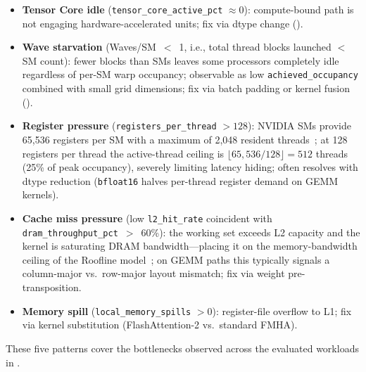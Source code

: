 \begin{itemize}[leftmargin=1.5em]
  \item \textbf{Tensor Core idle} (\texttt{tensor\_core\_active\_pct} $\approx 0$):
    compute-bound path is not engaging hardware-accelerated units; fix via dtype change
    ().
  \item \textbf{Wave starvation} (Waves/SM~$<$~1, i.e., total thread blocks launched
    $<$ SM count): fewer blocks than SMs leaves some processors completely idle
    regardless of per-SM warp occupancy; observable as low \texttt{achieved\_occupancy}
    combined with small grid dimensions; fix via batch padding or kernel fusion
    ().
  \item \textbf{Register pressure} (\texttt{registers\_per\_thread} $> 128$):
    NVIDIA SMs provide 65,536 registers per SM with a maximum of 2,048 resident
    threads~\cite{cudaprogrammingguide}; at 128 registers per thread the
    active-thread ceiling is $\lfloor 65{,}536 / 128 \rfloor = 512$ threads
    (25\% of peak occupancy), severely limiting latency hiding; often resolves
    with dtype reduction (\texttt{bfloat16} halves per-thread register demand on
    GEMM kernels).
  \item \textbf{Cache miss pressure} (low \texttt{l2\_hit\_rate} coincident with
    \texttt{dram\_throughput\_pct}~$>$~60\%): the working set exceeds L2 capacity
    and the kernel is saturating DRAM bandwidth---placing it on the memory-bandwidth
    ceiling of the Roofline model~\cite{williams2009roofline}; on GEMM paths this
    typically signals a column-major vs.\ row-major layout mismatch; fix via weight
    pre-transposition.
  \item \textbf{Memory spill} (\texttt{local\_memory\_spills} $> 0$):
    register-file overflow to L1; fix via kernel substitution (FlashAttention-2 vs.\ standard FMHA).
\end{itemize}

These five patterns cover the bottlenecks observed across the evaluated workloads in
.

